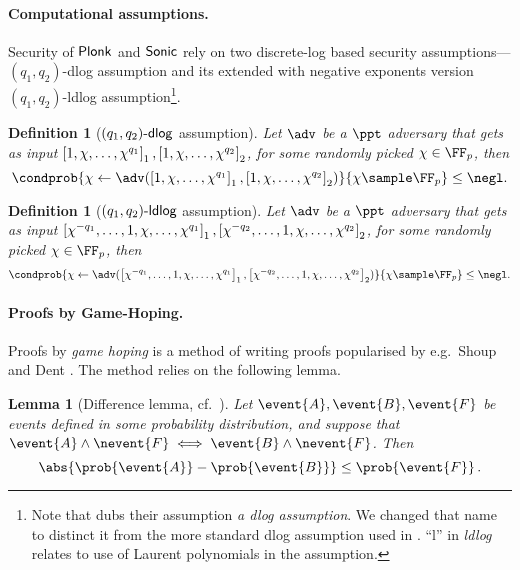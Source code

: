 \let\accentvec\vec \documentclass[runningheads,10pt]{llncs}
\newtheorem{lemma}[theorem]{Lemma}
\newtheorem{definition}[theorem]{Definition}
\begin{document}
\paragraph{Computational assumptions.}
Security of $\textnormal{\textsf{Plonk}}$ and ${\textnormal{\textsf{Sonic}}}$ rely on two discrete-log based security
assumptions---$(q_1, q_2)$-dlog assumption and its extended with
negative exponents version $(q_1,
q_2)$-ldlog assumption\footnote{Note that \cite{CCS:MBKM19} dubs their
	assumption \emph{a dlog assumption}. We changed that name to distinct it
from the more standard dlog assumption used in \cite{EPRINT:GabWilCio19}.
``l'' in \emph{ldlog} relates to use of Laurent polynomials in the assumption.}.
\begin{definition}[$(q_1, q_2)\text{-}\mathsf{dlog}$ assumption]
	Let $\adv$ be a $\ppt$ adversary that gets as input $\left[1, \chi, \ldots, \chi^{q_1}\right]_{1}, \left[1, \chi, \ldots, \chi^{q_2}\right]_{2}$, for some randomly picked $\chi \in \FF_p$, then
	\[
		\condprob{\chi \gets \adv(\gone{1, \chi, \ldots, \chi^{q_1}}, \gtwo{1, \chi, \ldots, \chi^{q_2} })}{\chi \sample \FF_p} \leq \negl.
	\]
\end{definition}

\begin{definition}[$(q_1, q_2)\text{-}\mathsf{ldlog}$ assumption]
		Let $\adv$ be a $\ppt$ adversary that gets as input $\left[\chi^{-q_1},
		\ldots, 1, \chi, \ldots, \chi^{q_1}\right]_{1}, \left[\chi^{-q_2}, \ldots, 1, \chi, \ldots, \chi^{q_2}\right]_{2}$, for some randomly picked $\chi \in \FF_p$, then
	\[
			\condprob{\chi \gets \adv(\gone{\chi^{-q_1}, \ldots, 1, \chi, \ldots,
			\chi^{q_1}}, \gtwo{\chi^{-q_2}, \ldots, 1, \chi, \ldots, \chi^{q_2} })}{\chi \sample \FF_p} \leq \negl.
	\]
\end{definition}

\paragraph{Proofs by Game-Hoping.}
Proofs by \emph{game hoping} is a method of writing proofs popularised by e.g.~Shoup \cite{EPRINT:Shoup04} and Dent \cite{EPRINT:Dent06c}. The method relies on the following lemma.

\begin{lemma}[Difference lemma,  cf.~{\cite[Lemma 1]{EPRINT:Shoup04}}]
	\label{lem:difference_lemma}
	Let $\event{A}, \event{B}, \event{F}$ be events defined in some probability distribution, and suppose that $\event{A} \land \nevent{F} \iff \event{B} \land \nevent{F}$. 
	Then 
	\[
		\abs{\prob{\event{A}} - \prob{\event{B}}} \leq \prob{\event{F}}\,.
	\]
\end{lemma}
\end{document}
